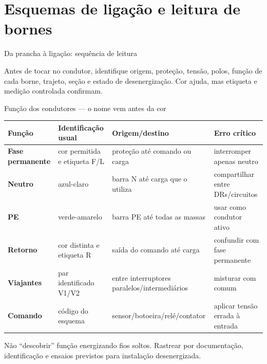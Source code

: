 
\section{Esquemas de ligação e leitura de bornes}

\begin{frame}{Da prancha à ligação: sequência de leitura}
\centering
{}
\vspace{5mm}
\begin{caixaAt}
Antes de tocar no condutor, identifique origem, proteção, tensão, polos, função de cada borne, trajeto, seção e estado de desenergização. Cor ajuda, mas etiqueta e medição controlada confirmam.
\end{caixaAt}
\end{frame}

\begin{frame}{Função dos condutores — o nome vem antes da cor}
\scriptsize
\begin{tabularx}{\textwidth}{>{\bfseries}p{2.35cm}p{2.3cm}X X}
\toprule
Função & Identificação usual & Origem/destino & Erro crítico \\
\midrule
Fase permanente & cor permitida e etiqueta F/L & proteção até comando ou carga & interromper apenas neutro \\
Neutro & azul-claro & barra N até carga que o utiliza & compartilhar entre DRs/circuitos \\
PE & verde-amarelo & barra PE até todas as massas & usar como condutor ativo \\
Retorno & cor distinta e etiqueta R & saída do comando até carga & confundir com fase permanente \\
Viajantes & par identificado V1/V2 & entre interruptores paralelos/intermediários & misturar com comum \\
Comando & código do esquema & sensor/botoeira/relé/contator & aplicar tensão errada à entrada \\
\bottomrule
\end{tabularx}
\begin{caixaAt}
Não “descobrir” função energizando fios soltos. Rastrear por documentação, identificação e ensaios previstos para instalação desenergizada.
\end{caixaAt}
\end{frame}

